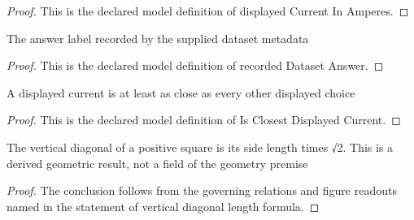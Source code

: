 \begin{proof}
  This is the declared model definition of displayed Current In Amperes.
\end{proof}
\begin{definition}
  \label{def:physics:phyx-mini-0931:phyxminiproblems-problemphyxmini0931-recordeddatasetanswer}
  The answer label recorded by the supplied dataset metadata
\end{definition}
\begin{proof}
  This is the declared model definition of recorded Dataset Answer.
\end{proof}
\begin{definition}
  \label{def:physics:phyx-mini-0931:phyxminiproblems-problemphyxmini0931-isclosestdisplayedcurrent}
  A displayed current is at least as close as every other displayed choice
\end{definition}
\begin{proof}
  This is the declared model definition of Is Closest Displayed Current.
\end{proof}
\begin{lemma}
  \label{lem:physics:phyx-mini-0931:phyxminiproblems-problemphyxmini0931-vertical-diagonal-length-formula}
  The vertical diagonal of a positive square is its side length times √2. This is a derived geometric result, not a field of the geometry premise
\end{lemma}
\begin{proof}
  The conclusion follows from the governing relations and figure readouts named in the statement of vertical diagonal length formula.
\end{proof}
